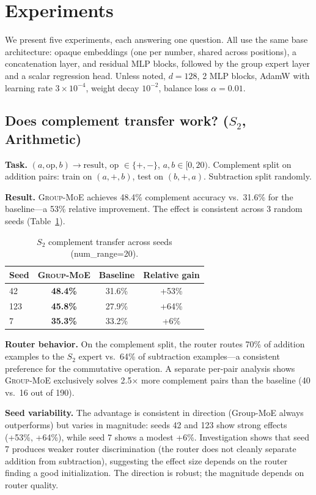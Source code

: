 \documentclass[10pt, letterpaper]{article}
\newcommand{\gmoe}{\textsc{Group-MoE}}
\begin{document}
\section{Experiments}
\label{sec:experiments}

We present five experiments, each answering one question. All use the same base architecture: opaque embeddings (one per number, shared across positions), a concatenation layer, and residual MLP blocks, followed by the group expert layer and a scalar regression head. Unless noted, $d = 128$, 2 MLP blocks, AdamW with learning rate $3 \times 10^{-4}$, weight decay $10^{-2}$, balance loss $\alpha = 0.01$.

\subsection{Does complement transfer work? ($S_2$, Arithmetic)}
\label{sec:exp-s2}

\textbf{Task.} $(a, \text{op}, b) \to \text{result}$, op $\in \{+, -\}$, $a, b \in [0, 20)$. Complement split on addition pairs: train on $(a, +, b)$, test on $(b, +, a)$. Subtraction split randomly.

\textbf{Result.} \gmoe{} achieves 48.4\% complement accuracy vs.\ 31.6\% for the baseline---a 53\% relative improvement. The effect is consistent across 3 random seeds (Table~\ref{tab:s2-seeds}).

\begin{table}[h]
\centering
\caption{$S_2$ complement transfer across seeds (num\_range=20).}
\label{tab:s2-seeds}
\begin{tabular}{lccc}
\toprule
Seed & \gmoe{} & Baseline & Relative gain \\
\midrule
42 & \textbf{48.4\%} & 31.6\% & +53\% \\
123 & \textbf{45.8\%} & 27.9\% & +64\% \\
7 & \textbf{35.3\%} & 33.2\% & +6\% \\
\bottomrule
\end{tabular}
\end{table}

\textbf{Router behavior.} On the complement split, the router routes 70\% of addition examples to the $S_2$ expert vs.\ 64\% of subtraction examples---a consistent preference for the commutative operation. A separate per-pair analysis shows \gmoe{} exclusively solves 2.5$\times$ more complement pairs than the baseline (40 vs.\ 16 out of 190).

\textbf{Seed variability.} The advantage is consistent in direction (Group-MoE always outperforms) but varies in magnitude: seeds 42 and 123 show strong effects (+53\%, +64\%), while seed 7 shows a modest +6\%. Investigation shows that seed 7 produces weaker router discrimination (the router does not cleanly separate addition from subtraction), suggesting the effect size depends on the router finding a good initialization. The direction is robust; the magnitude depends on router quality.
\end{document}

